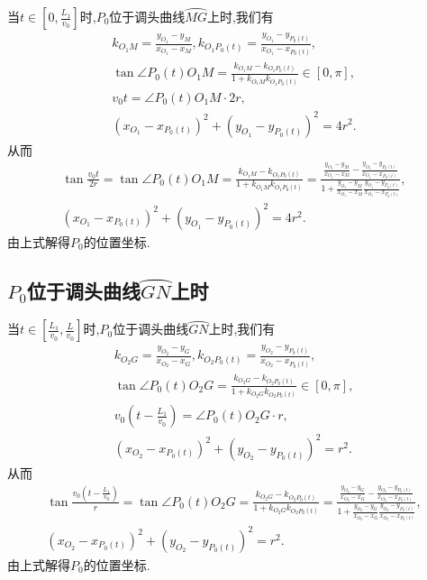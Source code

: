 \documentclass[lang=cn,newtx,10pt,scheme=chinese]{../Template/elegantbook}
\begin{document}
当$t\in[0,\frac{L_1}{v_0}]$时,$P_0$位于调头曲线$\wideparen{MG}$上时,我们有
\begin{gather}
k_{O_1M}=\frac{y_{O_1}-y_M}{x_{O_1}-x_M},k_{O_1P_0\left( t \right)}=\frac{y_{O_1}-y_{P_0\left( t \right)}}{x_{O_1}-x_{P_0\left( t \right)}},
\\
\tan \angle P_0\left( t \right) O_1M=\frac{k_{O_1M}-k_{O_1P_0\left( t \right)}}{1+k_{O_1M}k_{O_1P_0\left( t \right)}}\in \left[ 0,\pi \right] ,
\\
v_0t =\angle P_0\left( t \right) O_1M\cdot 2r,
\\
\left( x_{O_1}-x_{P_0\left( t \right)} \right) ^2+\left( y_{O_1}-y_{P_0\left( t \right)} \right) ^2=4r^2.
\end{gather}
从而
\begin{gather}
\tan \frac{v_0t}{2r}=\tan \angle P_0\left( t \right) O_1M=\frac{k_{O_1M}-k_{O_1P_0\left( t \right)}}{1+k_{O_1M}k_{O_1P_0\left( t \right)}}=\frac{\frac{y_{O_1}-y_M}{x_{O_1}-x_M}-\frac{y_{O_1}-y_{P_0\left( t \right)}}{x_{O_1}-x_{P_0\left( t \right)}}}{1+\frac{y_{O_1}-y_M}{x_{O_1}-x_M}\frac{y_{O_1}-y_{P_0\left( t \right)}}{x_{O_1}-x_{P_0\left( t \right)}}},
\\
\left( x_{O_1}-x_{P_0\left( t \right)} \right) ^2+\left( y_{O_1}-y_{P_0\left( t \right)} \right) ^2=4r^2.
\end{gather}
由上式解得$P_0$的位置坐标.

\subsection{$P_0$位于调头曲线$\wideparen{GN}$上时}

当$t\in[\frac{L_1}{v_0},\frac{L}{v_0}]$时,$P_0$位于调头曲线$\wideparen{GN}$上时,我们有
\begin{gather}
k_{O_2G}=\frac{y_{O_2}-y_G}{x_{O_2}-x_G},k_{O_2P_0\left( t \right)}=\frac{y_{O_2}-y_{P_0\left( t \right)}}{x_{O_2}-x_{P_0\left( t \right)}},
\\
\tan \angle P_0\left( t \right) O_2G=\frac{k_{O_2G}-k_{O_2P_0\left( t \right)}}{1+k_{O_2G}k_{O_2P_0\left( t \right)}}\in \left[ 0,\pi \right] ,
\\
v_0\left( t-\frac{L_1}{v_0} \right) =\angle P_0\left( t \right) O_2G\cdot r,
\\
\left( x_{O_2}-x_{P_0\left( t \right)} \right) ^2+\left( y_{O_2}-y_{P_0\left( t \right)} \right) ^2=r^2.
\end{gather}
从而
\begin{gather}
\tan \frac{v_0\left( t-\frac{L_1}{v_0} \right)}{r}=\tan \angle P_0\left( t \right) O_2G=\frac{k_{O_2G}-k_{O_2P_0\left( t \right)}}{1+k_{O_2G}k_{O_2P_0\left( t \right)}}=\frac{\frac{y_{O_2}-y_G}{x_{O_2}-x_G}-\frac{y_{O_2}-y_{P_0\left( t \right)}}{x_{O_2}-x_{P_0\left( t \right)}}}{1+\frac{y_{O_2}-y_G}{x_{O_2}-x_G}\frac{y_{O_2}-y_{P_0\left( t \right)}}{x_{O_2}-x_{P_0\left( t \right)}}},
\\
\left( x_{O_2}-x_{P_0\left( t \right)} \right) ^2+\left( y_{O_2}-y_{P_0\left( t \right)} \right) ^2=r^2.
\end{gather}
由上式解得$P_0$的位置坐标.
\end{document}
